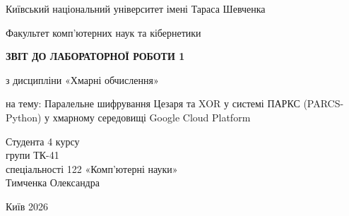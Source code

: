 \documentclass[12pt,a4paper]{article}
\begin{document}
\begin{titlepage}
\centering
\thispagestyle{empty}
{\large Київський національний університет імені Тараса Шевченка\par}
{\large Факультет комп'ютерних наук та кібернетики\par}
\vspace{4cm}
{\Large\bfseries ЗВІТ ДО ЛАБОРАТОРНОЇ РОБОТИ 1\par}
\vspace{0.5cm}
{\large з дисципліни «Хмарні обчислення»\par}
\vspace{0.5cm}
{\large на тему: Паралельне шифрування Цезаря та XOR у системі ПАРКС (PARCS-Python) у хмарному середовищі Google Cloud Platform\par}
\vfill
\begin{flushright}
\large
Студента 4 курсу\\
групи ТК-41\\
спеціальності 122 «Комп'ютерні науки»\\
Тимченка Олександра
\end{flushright}
\vfill
{\large Київ 2026\par}
\end{titlepage}

\tableofcontents
\newpage


\end{document}
